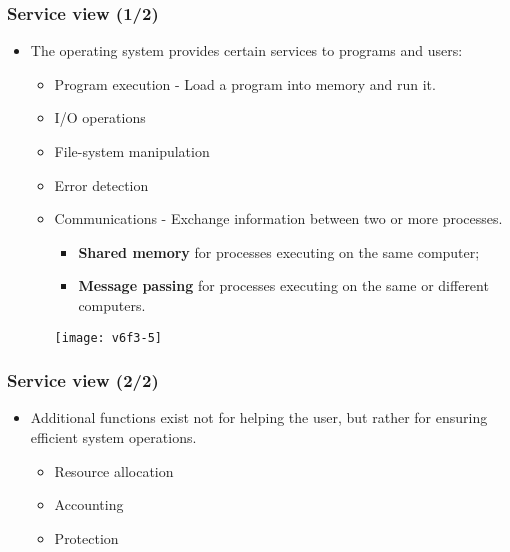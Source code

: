 \documentclass[CJKutf8,dvipsnames,table]{beamer}
\begin{document}
\begin{CJK*}{UTF8}{song}
  \begin{frame}
    \frametitle{Service view (1/2)} \pause
    \begin{itemize}
    \item The operating system provides certain services to programs and users:  \pause
      \begin{itemize}
      \item Program execution \pause - Load a program into memory and run it.  \pause
      \item I/O operations  \pause
      \item File-system manipulation  \pause
      \item Error detection  \pause
      \item Communications \pause - Exchange information between two or more processes. \\ \pause
        \begin{minipage}[c]{0.4\textwidth}
          \begin{itemize}
          \item \textbf{Shared memory} for processes executing on the same computer;  \pause
          \item \textbf{Message passing} for processes executing on the same or different computers.  \pause
          \end{itemize}
        \end{minipage}%
        \begin{minipage}[c]{0.6\textwidth}
          \texttt{[image: v6f3-5]}
        \end{minipage}
      \end{itemize}
    \end{itemize}
  \end{frame}

  \begin{frame}
    \frametitle{Service view (2/2)} \pause
    \begin{itemize}
    \item Additional functions exist not for helping the user, but rather for ensuring efficient system operations.  \pause
      \begin{itemize}
      \item Resource allocation  \pause
      \item Accounting  \pause
      \item Protection 
      \end{itemize}
    \end{itemize}
  \end{frame}


\end{CJK*}
\end{document}
